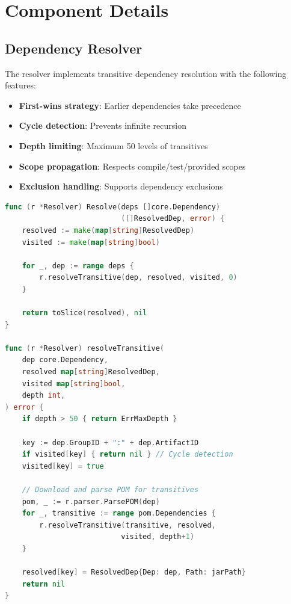 \documentclass[12pt,a4paper]{report}
\begin{document}
\section{Component Details}

\subsection{Dependency Resolver}

The resolver implements transitive dependency resolution with the following features:

\begin{itemize}
    \item \textbf{First-wins strategy}: Earlier dependencies take precedence
    \item \textbf{Cycle detection}: Prevents infinite recursion
    \item \textbf{Depth limiting}: Maximum 50 levels of transitives
    \item \textbf{Scope propagation}: Respects compile/test/provided scopes
    \item \textbf{Exclusion handling}: Supports dependency exclusions
\end{itemize}

\begin{lstlisting}[language=Go, caption=Resolver Algorithm]
func (r *Resolver) Resolve(deps []core.Dependency) 
                           ([]ResolvedDep, error) {
    resolved := make(map[string]ResolvedDep)
    visited := make(map[string]bool)
    
    for _, dep := range deps {
        r.resolveTransitive(dep, resolved, visited, 0)
    }
    
    return toSlice(resolved), nil
}

func (r *Resolver) resolveTransitive(
    dep core.Dependency,
    resolved map[string]ResolvedDep,
    visited map[string]bool,
    depth int,
) error {
    if depth > 50 { return ErrMaxDepth }
    
    key := dep.GroupID + ":" + dep.ArtifactID
    if visited[key] { return nil } // Cycle detection
    visited[key] = true
    
    // Download and parse POM for transitives
    pom, _ := r.parser.ParsePOM(dep)
    for _, transitive := range pom.Dependencies {
        r.resolveTransitive(transitive, resolved, 
                           visited, depth+1)
    }
    
    resolved[key] = ResolvedDep{Dep: dep, Path: jarPath}
    return nil
}
\end{lstlisting}
\end{document}
